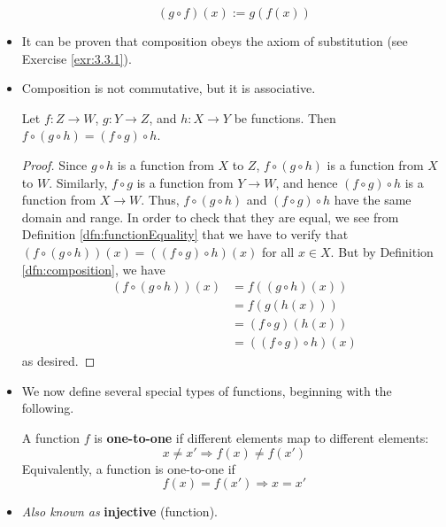 \documentclass[../main.tex]{subfiles}
\begin{document}
\begin{itemize}
\begin{dfn}[Composition]
\begin{equation*}
            (g\circ f)(x) := g(f(x))
        \end{equation*}
    \end{dfn}
    \item It can be proven that composition obeys the axiom of substitution (see Exercise \ref{exr:3.3.1}).
    \item Composition is not commutative, but it is associative.
    \begin{lem}
        Let $f:Z\to W$, $g:Y\to Z$, and $h:X\to Y$ be functions. Then $f\circ(g\circ h)=(f\circ g)\circ h$.
        \begin{proof}
            Since $g\circ h$ is a function from $X$ to $Z$, $f\circ(g\circ h)$ is a function from $X$ to $W$. Similarly, $f\circ g$ is a function from $Y\to W$, and hence $(f\circ g)\circ h$ is a function from $X\to W$. Thus, $f\circ(g\circ h)$ and $(f\circ g)\circ h$ have the same domain and range. In order to check that they are equal, we see from Definition \ref{dfn:functionEquality} that we have to verify that $(f\circ(g\circ h))(x)=((f\circ g)\circ h)(x)$ for all $x\in X$. But by Definition \ref{dfn:composition}, we have
            \begin{align*}
                (f\circ(g\circ h))(x) &= f((g\circ h)(x))\\
                &= f(g(h(x)))\\
                &= (f\circ g)(h(x))\\
                &= ((f\circ g)\circ h)(x)
            \end{align*}
            as desired.
        \end{proof}
    \end{lem}
    \item {}We now define several special types of functions, beginning with the following.
    \begin{dfn}\label{dfn:injective}
        A function $f$ is \textbf{one-to-one} if different elements map to different elements:
        \begin{equation*}
            x \neq x' \Longrightarrow f(x) \neq f(x')
        \end{equation*}
        Equivalently, a function is one-to-one if
        \begin{equation*}
            f(x) = f(x') \Longrightarrow x = x'
        \end{equation*}
    \end{dfn}
    \item \emph{Also known as} \textbf{injective} (function).

\end{itemize}
\end{document}
